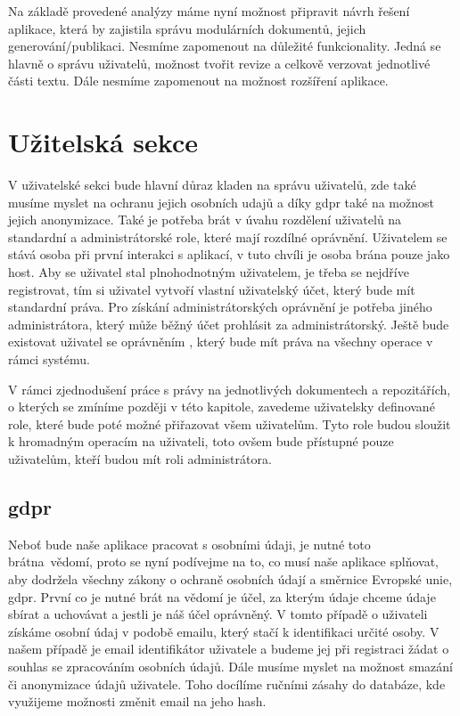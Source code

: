 Na základě provedené analýzy máme nyní možnost připravit návrh řešení aplikace, která by zajistila správu modulárních dokumentů, jejich\linebreak
generování/publikaci.
Nesmíme zapomenout na důležité funkcionality. Jedná se hlavně o správu uživatelů, možnost tvořit revize a celkově verzovat jednotlivé části textu.
Dále nesmíme zapomenout na možnost rozšíření aplikace.

\section{Užitelská sekce}

V uživatelské sekci bude hlavní důraz kladen na správu uživatelů, zde také musíme myslet na ochranu jejich osobních udajů a díky \gls{gdpr} také na
možnost jejich anonymizace. Také je potřeba brát v úvahu rozdělení uživatelů na standardní a administrátorské role, které mají rozdílné oprávnění.
Uživatelem se stává osoba při první interakci s aplikací, v tuto chvíli je osoba brána pouze jako host. Aby se uživatel stal plnohodnotným uživatelem,
je třeba se nejdříve registrovat, tím si uživatel vytvoří vlastní uživatelský účet, který bude mít standardní práva. Pro získání administrátorských
oprávnění je potřeba jiného administrátora, který může běžný účet prohlásit za administrátorský. Ještě bude existovat uživatel se oprávněním
, který bude mít práva na všechny operace v rámci systému.

V rámci zjednodušení práce s právy na jednotlivých dokumentech a repozitářích, o kterých se zmíníme později v této kapitole, zavedeme uživatelsky
definované role, které bude poté možné přiřazovat všem uživatelům. Tyto role budou sloužit k hromadným operacím na uživateli, toto ovšem bude
přístupné pouze uživatelům, kteří budou mít roli administrátora.

\subsection{\gls{gdpr}}

Neboť bude naše aplikace pracovat s osobními údaji, je nutné toto brát\linebreak na~vědomí, proto se nyní podívejme na to, co musí naše aplikace splňovat, aby dodržela všechny
zákony o ochraně osobních údají a směrnice Evropské unie, \gls{gdpr}. První co je nutné brát na vědomí je účel, za kterým údaje chceme údaje sbírat a uchovávat a jestli je náš
účel oprávněný. V tomto případě o uživateli získáme osobní údaj v podobě emailu, který stačí k identifikaci určité osoby. V našem případě je email identifikátor uživatele
a budeme jej při registraci žádat o souhlas se zpracováním osobních údajů. Dále musíme myslet na možnost smazání či anonymizace údajů uživatele. Toho docílíme ručními
zásahy do databáze, kde využijeme možnosti změnit email na jeho hash. \cite{gdpr}


